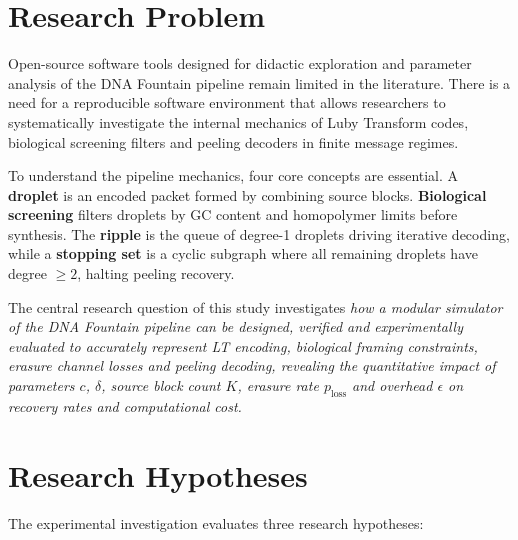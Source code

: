 \section{Research Problem}

Open-source software tools designed for didactic exploration and parameter analysis of the DNA Fountain pipeline remain limited in the literature. There is a need for a reproducible software environment that allows researchers to systematically investigate the internal mechanics of Luby Transform codes, biological screening filters and peeling decoders in finite message regimes.

To understand the pipeline mechanics, four core concepts are essential. A \textbf{droplet} is an encoded packet formed by combining source blocks. \textbf{Biological screening} filters droplets by GC content and homopolymer limits before synthesis. The \textbf{ripple} is the queue of degree-1 droplets driving iterative decoding, while a \textbf{stopping set} is a cyclic subgraph where all remaining droplets have degree $\ge 2$, halting peeling recovery.

The central research question of this study investigates \emph{how a modular simulator of the DNA Fountain pipeline can be designed, verified and experimentally evaluated to accurately represent LT encoding, biological framing constraints, erasure channel losses and peeling decoding, revealing the quantitative impact of parameters $c$, $\delta$, source block count $K$, erasure rate $p_{\text{loss}}$ and overhead $\epsilon$ on recovery rates and computational cost.}

\section{Research Hypotheses}
\label{sec:hypotheses}

The experimental investigation evaluates three research hypotheses:

